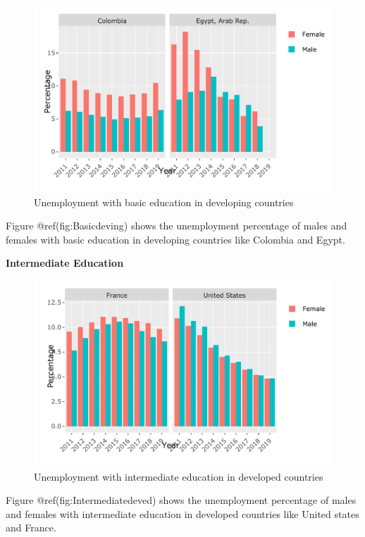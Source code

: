 \documentclass[
]{article}
\begin{document}
\begin{figure}
\centering
\includegraphics{The_Outsiders_5513_files/figure-latex/Basicdeving-1.pdf}
\caption{Unemployment with basic education in developing countries}
\end{figure}

Figure @ref(fig:Basicdeving) shows the unemployment percentage of males
and females with basic education in developing countries like Colombia
and Egypt.

\textbf{Intermediate Education}

\begin{figure}
\centering
\includegraphics{The_Outsiders_5513_files/figure-latex/Intermediatedeved-1.pdf}
\caption{Unemployment with intermediate education in developed
countries}
\end{figure}

Figure @ref(fig:Intermediatedeved) shows the unemployment percentage of
males and females with intermediate education in developed countries
like United states and France.
\end{document}
